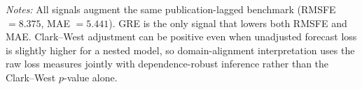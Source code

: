 \begin{table}[htbp]
\centering\small
\caption{Domain-alignment comparators at the one-month forecast horizon}
\label{tab:comparator}
\vspace{0.35em}
\begin{minipage}{0.97\textwidth}\normalsize\textit{Notes:} All signals augment the same publication-lagged benchmark (RMSFE $=8.375$, MAE $=5.441$). GRE is the only signal that lowers both RMSFE and MAE. Clark--West adjustment can be positive even when unadjusted forecast loss is slightly higher for a nested model, so domain-alignment interpretation uses the raw loss measures jointly with dependence-robust inference rather than the Clark--West $p$-value alone.\end{minipage}
\end{table}
